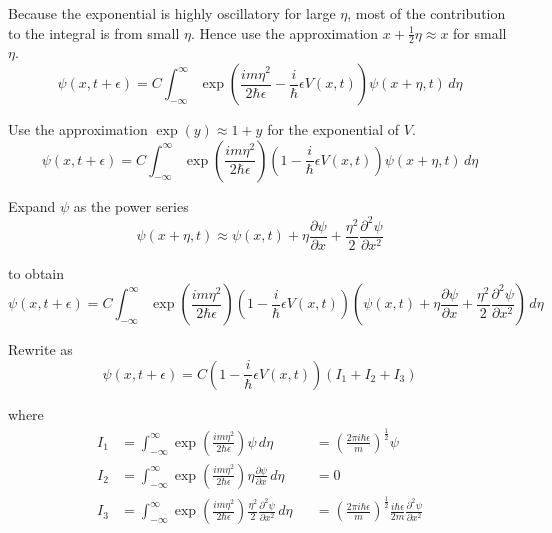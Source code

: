 Because the exponential is highly oscillatory for large $\eta$,
most of the contribution to the integral is from small $\eta$.
Hence use the approximation $x+\tfrac{1}{2}\eta\approx x$ for small $\eta$.
\begin{equation*}
\psi(x,t+\epsilon)=C\int_{-\infty}^\infty
\exp\left(\frac{im\eta^2}{2\hbar\epsilon}
-\frac{i}{\hbar}\epsilon V(x,t)\right)\psi(x+\eta,t)\,d\eta
\end{equation*}

Use the approximation $\exp(y)\approx1+y$ for the exponential of $V$.
\begin{equation*}
\psi(x,t+\epsilon)=C\int_{-\infty}^\infty
\exp\left(\frac{im\eta^2}{2\hbar\epsilon}\right)
\left(1-\frac{i}{\hbar}\epsilon V(x,t)\right)
\psi(x+\eta,t)\,d\eta
\end{equation*}

Expand $\psi$ as the power series
\begin{equation*}
\psi(x+\eta,t)\approx\psi(x,t)+\eta\frac{\partial\psi}{\partial x}
+\frac{\eta^2}{2}\frac{\partial^2\psi}{\partial x^2}
\end{equation*}

to obtain
\begin{equation*}
\psi(x,t+\epsilon)=C\int_{-\infty}^\infty
\exp\left(\frac{im\eta^2}{2\hbar\epsilon}\right)
\left(1-\frac{i}{\hbar}\epsilon V(x,t)\right)
\left(\psi(x,t)+\eta\frac{\partial\psi}{\partial x}
+\frac{\eta^2}{2}\frac{\partial^2\psi}{\partial x^2}\right)
\,d\eta
\end{equation*}

Rewrite as
\begin{equation*}
\psi(x,t+\epsilon)=C\left(1-\frac{i}{\hbar}\epsilon V(x,t)\right)(I_1+I_2+I_3)
\end{equation*}

where
\begin{align*}
I_1&=\int_{-\infty}^\infty\exp\left(\frac{im\eta^2}{2\hbar\epsilon}\right)\psi
\,d\eta
& &=\left(\frac{2\pi i\hbar\epsilon}{m}\right)^\frac{1}{2}\psi
\\
I_2&=\int_{-\infty}^\infty
\exp\left(\frac{im\eta^2}{2\hbar\epsilon}\right)
\eta\frac{\partial\psi}{\partial x}
\,d\eta
& &=0
\\
I_3&=\int_{-\infty}^\infty
\exp\left(\frac{im\eta^2}{2\hbar\epsilon}\right)
\frac{\eta^2}{2}\frac{\partial^2\psi}{\partial x^2}
\,d\eta
& &=\left(\frac{2\pi i\hbar\epsilon}{m}\right)^\frac{1}{2}
\frac{i\hbar\epsilon}{2m}\frac{\partial^2\psi}{\partial x^2}
\end{align*}

